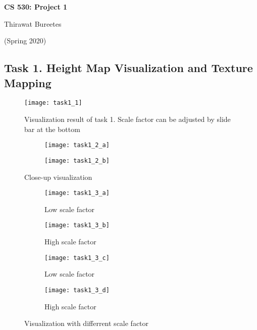 \documentclass[11pt]{article}
\begin{document}
\begin{center}
\Large{\textbf{CS 530: Project 1}}

Thirawat Bureetes

(Spring 2020)
\end{center}

\subsection*{Task 1. Height Map Visualization and Texture Mapping}

\begin{figure}[H]
\centering
\texttt{[image: task1\_1]}
\caption{Visualization result of task 1. Scale factor can be adjusted by slide bar at the bottom}
\label{fig: task1_1}
\end{figure}

\begin{figure}[H]
\begin{subfigure}{1\textwidth}
  \centering
  \texttt{[image: task1\_2\_a]}
  \caption{}
  \label{fig:task1_2_a}
\end{subfigure}
\begin{subfigure}{1\textwidth}
  \centering
  \texttt{[image: task1\_2\_b]}
  \caption{}
  \label{fig:task1_2_b}
\end{subfigure}

\caption{Close-up visualization}
\label{fig:task1_2}
\end{figure}


\begin{figure}[H]
\begin{subfigure}{.5\textwidth}
  \centering
  \texttt{[image: task1\_3\_a]}
  \caption{Low scale factor}
  \label{fig:task1_3_a}
\end{subfigure}
\begin{subfigure}{.5\textwidth}
  \centering
  \texttt{[image: task1\_3\_b]}
  \caption{High scale factor}
  \label{fig:task1_3_b}
\end{subfigure}

\begin{subfigure}{.5\textwidth}
  \centering
  \texttt{[image: task1\_3\_c]} 
  \caption{Low scale factor}
  \label{fig:task1_3_c}
\end{subfigure}
\begin{subfigure}{.5\textwidth}
  \centering
  \texttt{[image: task1\_3\_d]}
  \caption{High scale factor}
  \label{fig:task1_3_d}
\end{subfigure}
\caption{Visualization with differrent scale factor}
\label{fig:fig}
\end{figure}
\end{document}
